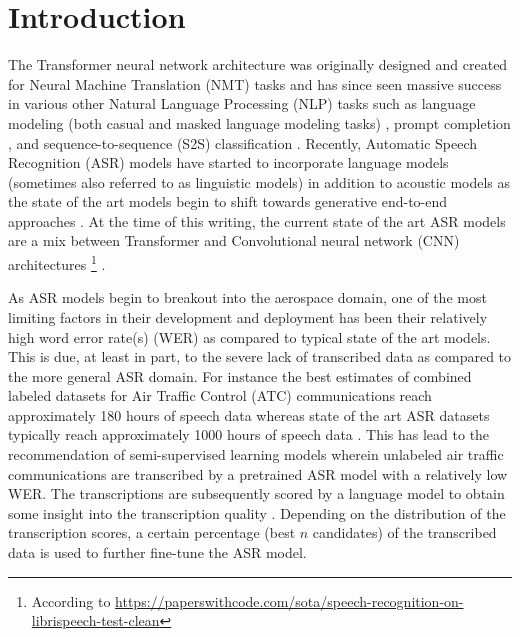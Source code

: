 \documentclass[10pt]{article}
\begin{document}
    \section{Introduction}
        The Transformer neural network architecture was originally designed and created for Neural Machine
        Translation (NMT) tasks \cite{vaswani_attention_2017} and has since seen massive success in various
        other Natural Language Processing (NLP) tasks such as language modeling (both casual and masked language
        modeling tasks) \cite{devlin_bert_2019}, prompt completion \cite{radford_improving_2018}, and
        sequence-to-sequence (S2S) classification \cite{lewis_bart_2019}.
        Recently, Automatic Speech Recognition (ASR) models have started to incorporate language models
        \cite{badrinath_automatic_2022} (sometimes also referred to as linguistic models) in addition to
        acoustic models \cite{li_jasper_2019} as the state of the art models begin to shift towards generative
        end-to-end approaches \cite{hannun_deep_2014}.
        At the time of this writing, the current state of the art ASR models are a mix between Transformer
        and Convolutional neural network (CNN) architectures
        \footnote{According to \url{https://paperswithcode.com/sota/speech-recognition-on-librispeech-test-clean}}
        \cite{baevski_wav2vec_2020}.


        As ASR models begin to breakout into the aerospace domain, one of the most limiting factors in their
        development and deployment has been their relatively high word error rate(s) (WER)
        \cite{smidl_air_2019,zuluaga-gomez_automatic_2020,badrinath_automatic_2022} as compared to typical state of the art models.
        This is due, at least in part, to the severe lack of transcribed data as compared to the more general ASR domain.
        For instance the best estimates of combined labeled datasets for Air Traffic Control (ATC)
        communications reach approximately 180 hours of speech data \cite{zuluaga-gomez_automatic_2020} whereas
        state of the art ASR datasets typically reach approximately 1000 hours of speech data \cite{panayotov_librispeech_2015}.
        This has lead to the recommendation of semi-supervised learning models wherein unlabeled air
        traffic communications are transcribed by a pretrained ASR model with a relatively low WER.
        The transcriptions are subsequently scored by a language model to obtain some insight into the
        transcription quality \cite{badrinath_automatic_2022,zuluaga-gomez_contextual_2021}.
        Depending on the distribution of the transcription scores, a certain percentage (best $n$ candidates)
        of the transcribed data is used to further fine-tune the ASR model.
\end{document}
